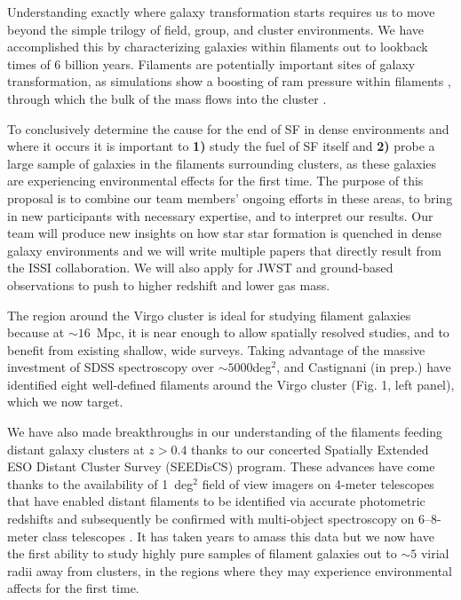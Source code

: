 \documentclass[11pt]{article}
\begin{document}
Understanding exactly where galaxy transformation starts requires us to move beyond the simple trilogy of field, group, and cluster environments.  We have accomplished this by characterizing galaxies within filaments out to lookback times of 6 billion years.  Filaments are potentially important sites of galaxy transformation, as simulations show a boosting of ram pressure within filaments \citep{Bahe13}, through which the bulk of the mass flows into the cluster \citep{Ramachandra15}. 

To conclusively determine the cause for the end of SF in dense environments and where it occurs it is important to \textbf{1)} study the fuel of SF itself and {\bf 2)} probe a large sample of galaxies in the filaments surrounding clusters, as these galaxies are experiencing environmental effects for the first time.  The purpose of this proposal is to combine our team members' ongoing efforts in these areas, to bring in new participants with necessary expertise, and to interpret our results.  Our team will produce new insights on how star star formation is quenched in dense galaxy environments and we will write multiple papers that directly result from the ISSI collaboration.  We will also apply for JWST and ground-based observations to push to higher redshift and lower gas mass.

  The region around the Virgo cluster is ideal for studying filament galaxies because at $\sim 16$~Mpc,  it is near enough to allow spatially resolved studies, and to benefit from existing shallow, wide surveys. Taking advantage of the massive investment of SDSS spectroscopy over $\sim 5000$deg$^2$, \citet{Kim16} and Castignani (in prep.) have identified eight well-defined filaments around the Virgo cluster (Fig. 1, left panel), which we now target.

We have also made breakthroughs in our understanding of the filaments feeding distant galaxy clusters at $z>0.4$ thanks to our concerted Spatially Extended ESO Distant Cluster Survey (SEEDisCS) program.  These advances have come thanks to the availability of 1~deg$^{2}$ field of view imagers on 4-meter telescopes that have enabled distant filaments to be identified via accurate photometric redshifts and subsequently be confirmed with multi-object spectroscopy on 6--8-meter class telescopes \citep[Fig. 1, right pax`nel;][]{Rerat17}.  It has taken years to amass this data but we now have the first ability to study highly pure samples of filament galaxies out to $\sim 5$ virial radii away from clusters, in the regions where they may experience environmental affects for the first time.
\end{document}
